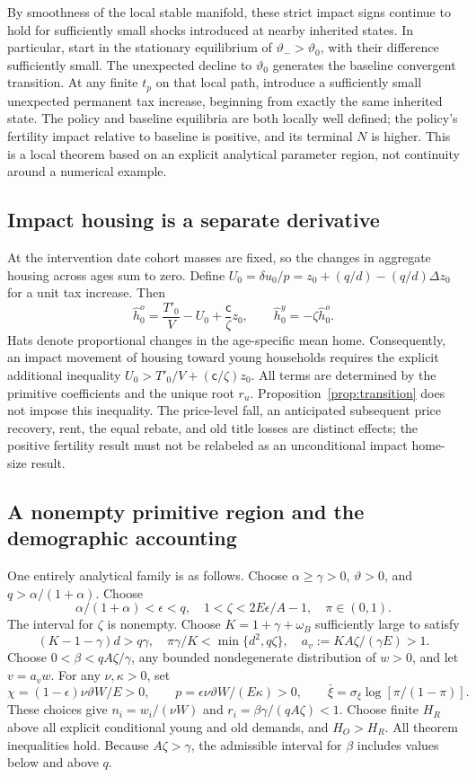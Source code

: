 \documentclass[11pt]{article}
\newcommand{\tht}{\vartheta}
\begin{document}
By smoothness of the local stable manifold, these strict impact signs continue to hold for sufficiently small shocks introduced at nearby inherited states. In particular, start in the stationary equilibrium of $\tht_->\tht_0$, with their difference sufficiently small. The unexpected decline to $\tht_0$ generates the baseline convergent transition. At any finite $t_p$ on that local path, introduce a sufficiently small unexpected permanent tax increase, beginning from exactly the same inherited state. The policy and baseline equilibria are both locally well defined; the policy's fertility impact relative to baseline is positive, and its terminal $N$ is higher. This is a local theorem based on an explicit analytical parameter region, not continuity around a numerical example.

\subsection{Impact housing is a separate derivative}
At the intervention date cohort masses are fixed, so the changes in aggregate housing across ages sum to zero. Define
$U_0=\delta u_0/p=z_0+(q/d)-(q/d)\Delta z_0$ for a unit tax increase. Then
\begin{equation}
 \widehat h^o_0=\frac{T'_0}{V}-U_0+\frac{\mathsf c}{\zeta}z_0,
 \qquad \widehat h^y_0=-\zeta\widehat h^o_0.\label{eq:impacthousing}
\end{equation}
Hats denote proportional changes in the age-specific mean home. Consequently, an impact movement of housing toward young households requires the explicit additional inequality
$U_0>T'_0/V+(\mathsf c/\zeta)z_0$.
All terms are determined by the primitive coefficients and the unique root $r_u$. Proposition~\ref{prop:transition} does not impose this inequality. The price-level fall, an anticipated subsequent price recovery, rent, the equal rebate, and old title losses are distinct effects; the positive fertility result must not be relabeled as an unconditional impact home-size result.

\subsection{A nonempty primitive region and the demographic accounting}
One entirely analytical family is as follows. Choose $\alpha\ge\gamma>0$, $\tht>0$, and
$q>\alpha/(1+\alpha)$. Choose
\[
 \alpha/(1+\alpha)<\epsilon<q,\quad
 1<\zeta<2E\epsilon/A-1,\quad \pi\in(0,1).
\]
The interval for $\zeta$ is nonempty. Choose $K=1+\gamma+\omega_B$ sufficiently large to satisfy
\[
 (K-1-\gamma)d>q\gamma,\quad
 \pi\gamma/K<\min\{d^2,q\zeta\},\quad
 a_v:=KA\zeta/(\gamma E)>1.
\]
Choose $0<\beta<qA\zeta/\gamma$, any bounded nondegenerate distribution of $w>0$, and let $v=a_vw$. For any $\nu,\kappa>0$, set
\[
 \chi=(1-\epsilon)\nu\tht W/E>0,\qquad
 p=\epsilon\nu\tht W/(E\kappa)>0,
 \qquad \bar\xi=\sigma_\xi\log[\pi/(1-\pi)].
\]
These choices give $n_i=w_i/(\nu W)$ and
$r_i=\beta\gamma/(qA\zeta)<1$. Choose finite $H_R$ above all explicit conditional young and old demands, and $H_O>H_R$. All theorem inequalities hold. Because $A\zeta>\gamma$, the admissible interval for $\beta$ includes values below and above $q$.
\end{document}
